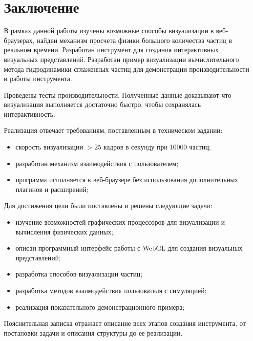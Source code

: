 \newpage
\section{Заключение}

В рамках данной работы изучены возможные способы визуализации в веб-браузерах,
найден механизм просчета физики большого количества частиц в реальном времени.
Разработан инструмент для создания интерактивных визуальных представлений.
Разработан пример визуализации вычислительного метода гидродинамики сглаженных 
частиц для демонстрации производительности и работы инструмента.

Проведены тесты производительности. Полученные данные доказывают что визуализация
выполняется достаточно быстро, чтобы сохранялась интерактивность.

Реализация отвечает требованиям, поставленным в техническом задании:

\begin{itemize}
  \item скорость визуализации $>25$ кадров в секунду при $10000$ частиц;
  \item разработан механизм взаимодействия с пользователем;
  \item программа исполняется в веб-браузере без использования дополнительных 
    плагинов и расширений;
\end{itemize}

Для достижения цели были поставлены и решены следующие задачи:

\begin{itemize}
  \item изучение возможностей графических процессоров для визуализации
    и вычисления физических данных;
  \item описан программный интерфейс работы с WebGL для создания
    визуальных представлений;
  \item разработка способов визуализации частиц;
  \item разработка методов взаимодействия пользователя с симуляцией;
  \item реализация показательного демонстрационного примера;
\end{itemize}

Пояснительная записка отражает описание всех этапов создания инструмента,
от постановки задачи и описания структуры до ее реализации.
